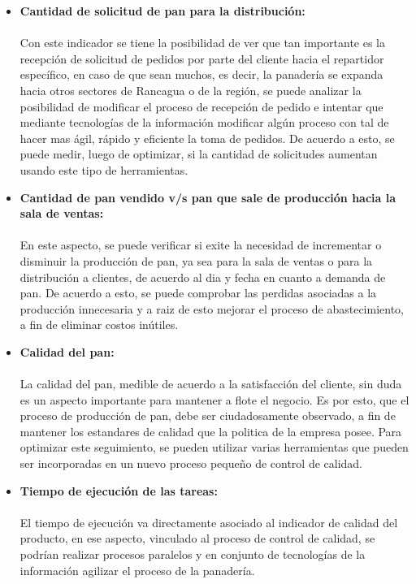 \begin{itemize}

\item \textbf{Cantidad de solicitud de pan para la distribución:}
\\
\\
Con este indicador se tiene la posibilidad de ver que tan importante es la recepci\'on de solicitud de pedidos por parte del cliente hacia el repartidor espec\'ifico, en caso de que sean muchos, es decir, la panadería se expanda hacia otros sectores de Rancagua o de la región, se puede analizar la posibilidad de modificar el proceso de recepci\'on de pedido e intentar que mediante tecnologías de la información modificar alg\'un  proceso con tal de hacer mas \'agil, r\'apido y eficiente la toma de pedidos. De acuerdo a esto, se puede medir, luego de optimizar, si la cantidad de solicitudes aumentan usando este tipo de herramientas.
\\
\item \textbf{Cantidad de pan vendido v/s pan que sale de producción hacia la sala de ventas:}
\\
\\
En este aspecto, se puede verificar si exite la necesidad de incrementar o disminuir la producci\'on de pan, ya sea para la sala de ventas o para la distribución a clientes, de acuerdo al dia y fecha en cuanto a demanda de pan. De acuerdo a esto, se puede comprobar las perdidas asociadas a la producción innecesaria y a raiz de esto mejorar el proceso de abastecimiento, a fin de eliminar costos in\'utiles.
\\
\item \textbf{Calidad del pan:}
\\
\\
La calidad del pan, medible de acuerdo a la satisfacción del cliente, sin duda es un aspecto importante para mantener a flote el negocio. Es por esto, que el proceso de producción de pan, debe ser ciudadosamente observado, a fin de mantener los estandares de calidad que la politica de la empresa posee. Para optimizar este seguimiento, se pueden utilizar varias herramientas que pueden ser incorporadas en un nuevo proceso pequeño de control de calidad. 
\\
\item \textbf{Tiempo de ejecución de las tareas:}
\\
\\
El tiempo de ejecución va directamente asociado al indicador de calidad del producto, en ese aspecto, vinculado al proceso de control de calidad, se podrían realizar procesos paralelos y en conjunto de tecnologías de la información agilizar el proceso de la panadería.

\end{itemize}
